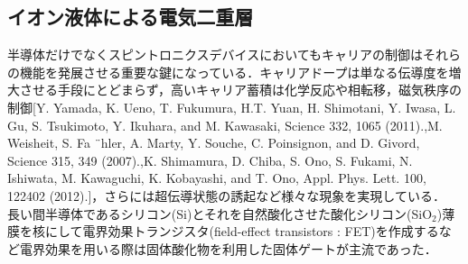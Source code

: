 \subsection{イオン液体による電気二重層}
半導体だけでなくスピントロニクスデバイスにおいてもキャリアの制御はそれらの機能を発展させる重要な鍵になっている．キャリアドープは単なる伝導度を増大させる手段にとどまらず，高いキャリア蓄積は化学反応や相転移，磁気秩序の制御[Y. Yamada, K. Ueno, T. Fukumura, H.T. Yuan, H. Shimotani, Y. Iwasa, L. Gu, S. Tsukimoto, Y. Ikuhara, and M. Kawasaki, Science 332, 1065 (2011).,M. Weisheit, S. Fa ¨hler, A. Marty, Y. Souche, C. Poinsignon, and D. Givord, Science 315, 349 (2007).,K. Shimamura, D. Chiba, S. Ono, S. Fukami, N. Ishiwata, M. Kawaguchi, K. Kobayashi, and T. Ono, Appl. Phys. Lett. 100, 122402 (2012).]，さらには超伝導状態の誘起など様々な現象を実現している．\\

長い間半導体であるシリコン(Si)とそれを自然酸化させた酸化シリコン(SiO$_{2}$)薄膜を核にして電界効果トランジスタ(field-effect transistors : FET)を作成するなど電界効果を用いる際は固体酸化物を利用した固体ゲートが主流であった．

